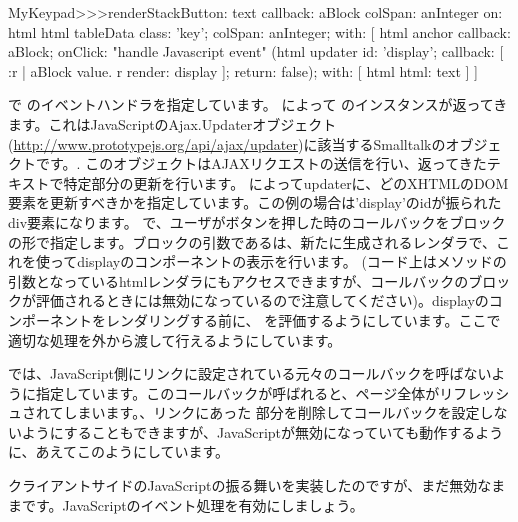 \documentclass[a4paper,10pt,twoside]{book}
\begin{document}
\begin{code}{}
MyKeypad>>>renderStackButton: text callback: aBlock colSpan: anInteger on: html 
	html tableData
		class: 'key';
		colSpan: anInteger;
		with: [
			html anchor
				callback: aBlock;
				onClick:				"handle Javascript event"
					(html updater
						id: 'display';
						callback: [ :r |
							aBlock value.
							r render: display ];
						return: false);
				with: [ html html: text ] ]
\end{code}

で のイベントハンドラを指定しています。
 によって のインスタンスが返ってきます。これはJavaScriptのAjax.Updaterオブジェクト(\url{http://www.prototypejs.org/api/ajax/updater})に該当するSmalltalkのオブジェクトです。.
このオブジェクトはAJAXリクエストの送信を行い、返ってきたテキストで特定部分の更新を行います。
 によってupdaterに、どのXHTMLのDOM要素を更新すべきかを指定しています。この例の場合は'display'のidが振られたdiv要素になります。
 で、ユーザがボタンを押した時のコールバックをブロックの形で指定します。ブロックの引数であるは、新たに生成されるレンダラで、これを使ってdisplayのコンポーネントの表示を行います。
(コード上はメソッドの引数となっているhtmlレンダラにもアクセスできますが、コールバックのブロックが評価されるときには無効になっているので注意してください)。displayのコンポーネントをレンダリングする前に、  を評価するようにしています。ここで適切な処理を外から渡して行えるようにしています。

 では、JavaScript側にリンクに設定されている元々のコールバックを呼ばないように指定しています。このコールバックが呼ばれると、ページ全体がリフレッシュされてしまいます。、リンクにあった 部分を削除してコールバックを設定しないようにすることもできますが、JavaScriptが無効になっていても動作するように、あえてこのようにしています。


クライアントサイドのJavaScriptの振る舞いを実装したのですが、まだ無効なままです。JavaScriptのイベント処理を有効にしましょう。


\end{document}
